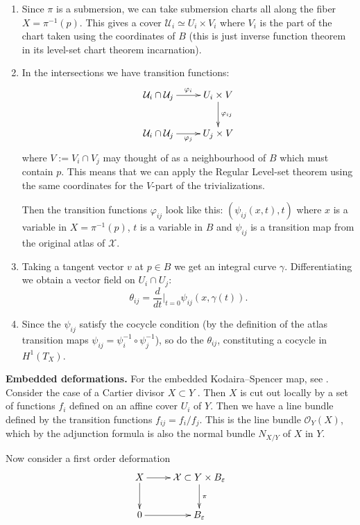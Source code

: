 \begin{enumerate}
\item Since $\pi$ is a submersion,
we can take submersion charts all along
the fiber $X = \pi^{-1}(p)$. This gives
a cover $\mathcal{U}_i\simeq U_i \times V_i$ 
where
$V_i$ is the part of the chart taken
using the coordinates of $B$
(this is just inverse function
theorem in its level-set chart theorem
incarnation).

\item In the intersections we have
transition functions:
$$
\xymatrix{
\mathcal{U}_i \cap \mathcal{U}_j
\ar[r]^{\varphi_i}& 
U_i \times V \ar[d]^{\varphi_{ij}}\\
\mathcal{U}_i \cap\mathcal{U}_j
\ar[r]_{\varphi_j}&
U_j \times V
}
$$
where $V:= V_i \cap V_j$ may thought
of as a neighbourhood of $B$
which must contain $p$.
This means that we can apply the
Regular Level-set theorem using the
same coordinates for the $V$-part
of the trivializations.

Then the transition functions
$\varphi_{ij}$ look like this:
$(\psi_{ij}(x,t),t)$ 
where $x$ is a variable
in $X = \pi^{-1}(p)$, 
$t$ is a variable in $B$
and $\psi_{ij}$ is a transition map from the
original atlas of $\mathcal{X}$.

\item Taking a tangent vector $v$ 
at $p \in B$ we get an 
integral curve $\gamma$.
Differentiating we obtain a vector field
on $U_i \cap U_j$:
$$
\theta_{ij}=\frac{d}{dt}\Big|_{t=0}
\psi_{ij}(x,\gamma(t)).
$$
\item Since the $\psi_{ij}$
satisfy the cocycle condition
(by the definition of the atlas
transition maps 
$\psi_{ij}=\psi_i^{-1}\circ \psi_j^{-1}$),
so do the $\theta_{ij}$, constituting
a cocycle in $H^1(T_X)$.
\end{enumerate}


\medskip\noindent
\textbf{Embedded deformations.}
For the embedded Kodaira--Spencer map,
see \cite[Proposition 3.2.1(ii)]
{Sernesi-deformations}.
Consider the case of a Cartier divisor
$X\subset Y$
\cite[Example 3.2.4(ii)]{Sernesi-deformations}.
Then $X$ is cut out locally by a set of
functions $f_i$
defined on an affine cover $U_i$ of $Y$.
Then we have a line bundle defined by the
transition functions $f_{ij}=f_i/f_j$.
This is the line bundle $\mathcal{O}_Y(X)$,
which
by the adjunction formula is also the normal
bundle $N_{X/Y}$
of $X$ in $Y$.

Now consider a first order deformation
$$
\xymatrix{
X\ar[r]\ar[d]
&\mathcal{X}\subset Y\times
B_\varepsilon\ar[d]^\pi\\
0\ar[r]
&B_\varepsilon
}
$$

